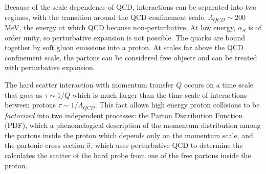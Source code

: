 Because of the scale dependence of QCD, interactions can be separated into two regimes, with the transition around the QCD confinement scale, $\Lambda_{QCD} \sim 200$ MeV, the energy at which QCD because non-perturbative. At low energy, $\alpha_S$ is of order unity, so perturbative expansion is not possible. The quarks are bound together by soft gluon emissions into a proton. At scales far above the QCD confinement scale, the partons can be considered free objects and can be treated with perturbative expansion.

The hard scatter interaction with momentum transfer $Q$ occurs on a time scale that goes as $\tau \sim 1/Q$ which is much larger than the time scale of interactions between protons $\tau \sim 1/\Lambda_{QCD}$. This fact allows high energy proton collisions to be \textit{factorized} into two independent processes: the Parton Distribution Function (PDF), which a phenomelogical description of the momentum distribution among the partons inside the proton which depends only on the momentum scale, and the partonic cross section $\hat{\sigma}$, which uses perturbative QCD to determine the calculates the scatter of the hard probe from one of the free partons inside the proton.


